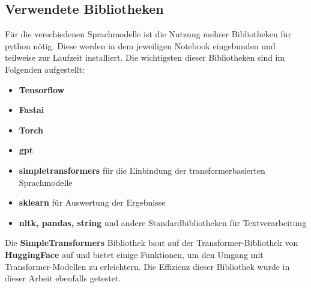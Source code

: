 \subsection{Verwendete Bibliotheken}
F\"ur die verschiedenen Sprachmodelle ist die Nutzung mehrer Bibliotheken f\"ur python n\"otig. Diese werden in dem jeweiligen Notebook eingebunden und teilweise zur Laufzeit installiert. Die wichtigsten dieser Bibliotheken sind im Folgenden aufgestellt:
\begin{itemize}
\item \textbf{Tensorflow}
\item \textbf{Fastai}
\item \textbf{Torch}
\item \textbf{gpt}
\item \textbf{simpletransformers} \cite{simpletransformers} f\"ur die Einbindung der transformerbasierten Sprachmodelle
\item \textbf{sklearn} f\"ur Auswertung der Ergebnisse
\item \textbf{nltk, pandas, string} und andere Standardbibliotheken f\"ur Textverarbeitung 
\end{itemize}
Die \textbf{SimpleTransformers} Bibliothek baut auf der Transformer-Bibliothek von \textbf{HuggingFace} auf und bietet einige Funktionen, um den Umgang mit Transformer-Modellen zu erleichtern. Die Effizienz dieser Bibliothek wurde in dieser Arbeit ebenfalls getestet.

